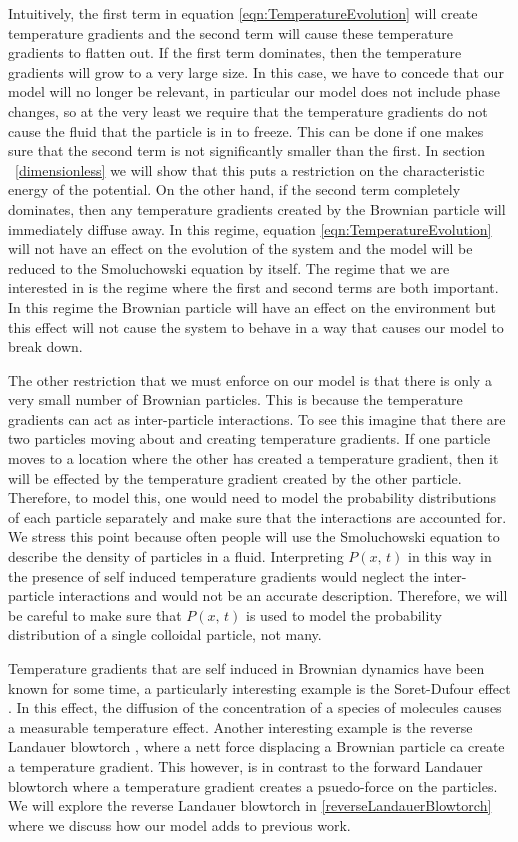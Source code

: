 Intuitively, the first term in equation \ref{eqn:TemperatureEvolution} will create temperature gradients and the second term will cause these temperature gradients to flatten out. If the first term dominates, then the temperature gradients will grow to a very large size. In this case, we have to concede that our model will no longer be relevant, in particular our model does not include phase changes, so at the very least we require that the temperature gradients do not cause the fluid that the particle is in to freeze. This can be done if one makes sure that the second term is not significantly smaller than the first. In section ~\autoref{dimensionless} we will show that this puts a restriction on the characteristic energy of the potential. On the other hand, if the second term completely dominates, then any temperature gradients created by the Brownian particle will immediately diffuse away. In this regime, equation \ref{eqn:TemperatureEvolution} will not have an effect on the evolution of the system and the model will be reduced to the Smoluchowski equation by itself. The regime that we are interested in is the regime where the first and second terms are both important. In this regime the Brownian particle will have an effect on the environment but this effect will not cause the system to behave in a way that causes our model to break down. 

The other restriction that we must enforce on our model is that there is only a very small number of Brownian particles. This is because the temperature gradients can act as inter-particle interactions. To see this imagine that there are two particles moving about and creating temperature gradients. If one particle moves to a location where the other has created a temperature gradient, then it will be effected by the temperature gradient created by the other particle. Therefore, to model this, one would need to model the probability distributions of each particle separately and make sure that the interactions are accounted for. We stress this point because often people will use the Smoluchowski equation to describe the density of particles in a fluid. Interpreting $P(x, \, t)$ in this way in the presence of self induced temperature gradients would neglect the inter-particle interactions and would not be an accurate description. Therefore, we will be careful to make sure that $P(x, \, t)$ is used to model the probability distribution of a single colloidal particle, not many.  

Temperature gradients that are self induced in Brownian dynamics have been known for some time, a particularly interesting example is the Soret-Dufour effect \cite{Onsager1931,HortLinzLuecke1992,PiazzaGuarino2002,Santamaria-HolekGadomskiRubi2011}. In this effect, the diffusion of the concentration of a species of molecules causes a measurable temperature effect. Another interesting example is the reverse Landauer blowtorch \cite{DasDasBarikEtAl2015}, where a nett force displacing a Brownian particle ca create a temperature gradient. This however, is in contrast to the forward Landauer blowtorch where a temperature gradient creates a psuedo-force on the particles. We will explore the reverse Landauer blowtorch in \autoref{reverseLandauerBlowtorch} where we discuss how our model adds to previous work.

